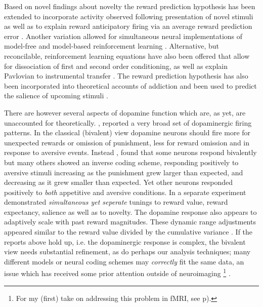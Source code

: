 \documentclass[doc,12pt]{apa}        %
\begin{document}
Based on novel findings about novelty \cite{Bunzeck:2006p5319, Blatter:2006p6372, GuitartMasip:2010p7244} the reward prediction hypothesis has been extended to incorporate activity observed following presentation of novel stimuli \cite{Kakade:2002p6414} as well as to explain reward anticipatory firing via an average reward prediction error \cite{Knutson:2007p1687}. Another variation allowed for simultaneous neural implementations of model-free and model-based reinforcement learning \cite{Smith:2006p7627, Daw:2011p7995}. Alternative, but reconcilable, reinforcement learning equations have also been offered that allow for dissociation of first and second order conditioning, as well as explain Pavlovian to instrumental transfer \cite{OReilly:2007p827}. The reward prediction hypothesis has also been incorporated into theoretical accounts of addiction \cite{Redish:2004p2531} and been used to predict the salience of upcoming stimuli \cite{Behrens:2007p8839}.   

There are however several aspects of dopamine function which are, as yet, are unaccounted for theoretically.  , reported a very broad set of dopaminergic firing patterns. In the classical (bivalent) view dopamine neurons should fire more for unexpected rewards or omission of punishment, less for reward omission and in response to aversive events.   Instead , found that some neurons respond bivalently but many others showed an inverse coding scheme, responding positively to aversive stimuli increasing as the punishment grew larger than expected, and decreasing as it grew smaller than expected.  Yet other neurons responded positively to \emph{both} appetitive and aversive conditions.  In a separate experiment  demonstrated \emph{simultaneous yet seperate} tunings to reward value, reward expectancy, salience as well as to novelty.   The dopamine response also appears to adaptively scale with past reward magnitudes.  These dynamic range adjustments appeared similar to the reward value divided by the cumulative variance \cite{Tobler:2005p6373}.  If the reports above hold up, i.e. the dopaminergic response is complex, the bivalent view needs substantial refinement, as do perhaps our analysis techniques; many different models or neural coding schemes may \emph{correctly} fit the same data, an issue which has received some prior attention outside of neuroimaging
\footnote{
    For my (first) take on addressing this problem in fMRI, see p\pageref{subsub:tomany}).
} \cite{Chamberlin:1965p8873}.
\end{document}
